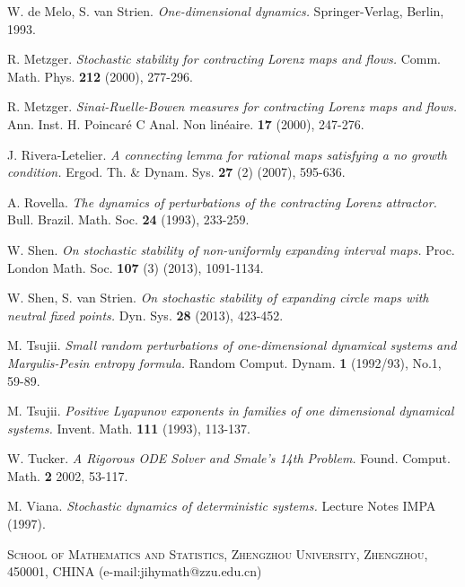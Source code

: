 \documentclass[11pt,oneside]{article}
\theoremstyle{plain}
\numberwithin{equation}{section}
\numberwithin{figure}{section}
\numberwithin{table}{section}
\begin{document}
\begin{thebibliography}{}
W. de Melo, S. van Strien. {\it  One-dimensional dynamics.}
Springer-Verlag, Berlin, 1993.

R. Metzger. {\it Stochastic stability for contracting Lorenz maps and flows.} Comm. Math. Phys. {\bf 212} (2000), 277-296.

R. Metzger. {\it Sinai-Ruelle-Bowen measures for contracting Lorenz maps and flows.} Ann. Inst. H. Poincar\'e C Anal. Non lin\'eaire. {\bf 17} (2000), 247-276.

J. Rivera-Letelier. {\it A connecting lemma for rational maps satisfying a no growth condition.} Ergod. Th. \& Dynam. Sys. {\bf 27} (2) (2007), 595-636.

A. Rovella. {\it The dynamics of perturbations of the contracting Lorenz attractor.} Bull. Brazil. Math. Soc. {\bf 24} (1993), 233-259. 

W. Shen. {\it On stochastic stability of non-uniformly expanding interval maps.} Proc. London Math. Soc. {\bf 107} (3) (2013), 1091-1134.

W. Shen, S. van Strien. {\it On stochastic stability of expanding circle maps with neutral fixed points.} Dyn. Sys. {\bf 28} (2013), 423-452.

M. Tsujii. {\it Small random perturbations of one-dimensional dynamical systems and Margulis-Pesin entropy formula.}  Random Comput. Dynam. {\bf 1}  (1992/93), No.1, 59-89.

M. Tsujii. {\it Positive Lyapunov exponents in families of one dimensional dynamical systems.} Invent. Math. {\bf 111} (1993), 113-137.

W. Tucker. {\it A Rigorous ODE Solver and Smale’s 14th Problem.} Found. Comput. Math. {\bf 2} 2002, 53-117.

M. Viana. {\it Stochastic dynamics of deterministic systems.} Lecture Notes IMPA (1997).


\end{thebibliography}

{\textsc{ School of Mathematics and Statistics,
Zhengzhou University, Zhengzhou,
450001,  CHINA}} (e-mail:jihymath@zzu.edu.cn)
\end{document}
